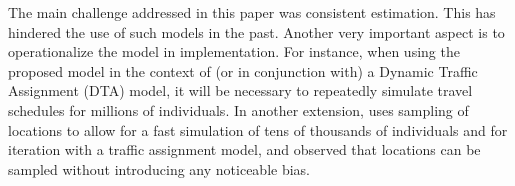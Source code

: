 The main challenge addressed in this paper was consistent estimation. This has hindered the use of such models in the past. Another very important aspect is to operationalize the model in implementation. For instance, when using the proposed model in the context of (or in conjunction with) a Dynamic Traffic Assignment (DTA) model, it will be necessary to repeatedly simulate travel schedules for millions of individuals. In another extension, \citet{saleem18largeScale} uses sampling of locations to allow for a fast simulation of tens of thousands of individuals and for iteration with a traffic assignment model, and observed that locations can be sampled without introducing any noticeable bias. 